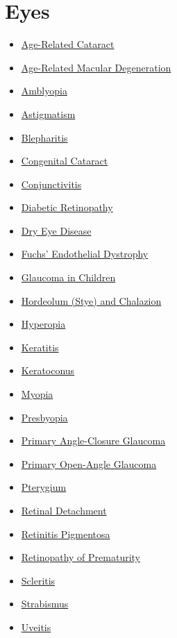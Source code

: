 \section*{Eyes}
\label{sec:organ_eyes}
\begin{itemize}[noitemsep]
  \item \hyperlink{sec:Age-Related Cataract}{Age-Related Cataract}
  \item \hyperlink{sec:Age-Related Macular Degeneration}{Age-Related Macular Degeneration}
  \item \hyperlink{sec:Amblyopia}{Amblyopia}
  \item \hyperlink{sec:Astigmatism}{Astigmatism}
  \item \hyperlink{sec:Blepharitis}{Blepharitis}
  \item \hyperlink{sec:Congenital Cataract}{Congenital Cataract}
  \item \hyperlink{sec:Conjunctivitis}{Conjunctivitis}
  \item \hyperlink{sec:Diabetic Retinopathy}{Diabetic Retinopathy}
  \item \hyperlink{sec:Dry Eye Disease}{Dry Eye Disease}
  \item \hyperlink{sec:Fuchs' Endothelial Dystrophy}{Fuchs' Endothelial Dystrophy}
  \item \hyperlink{sec:Glaucoma in Children}{Glaucoma in Children}
  \item \hyperlink{sec:Hordeolum (Stye) and Chalazion}{Hordeolum (Stye) and Chalazion}
  \item \hyperlink{sec:Hyperopia}{Hyperopia}
  \item \hyperlink{sec:Keratitis}{Keratitis}
  \item \hyperlink{sec:Keratoconus}{Keratoconus}
  \item \hyperlink{sec:Myopia}{Myopia}
  \item \hyperlink{sec:Presbyopia}{Presbyopia}
  \item \hyperlink{sec:Primary Angle-Closure Glaucoma}{Primary Angle-Closure Glaucoma}
  \item \hyperlink{sec:Primary Open-Angle Glaucoma}{Primary Open-Angle Glaucoma}
  \item \hyperlink{sec:Pterygium}{Pterygium}
  \item \hyperlink{sec:Retinal Detachment}{Retinal Detachment}
  \item \hyperlink{sec:Retinitis Pigmentosa}{Retinitis Pigmentosa}
  \item \hyperlink{sec:Retinopathy of Prematurity}{Retinopathy of Prematurity}
  \item \hyperlink{sec:Scleritis}{Scleritis}
  \item \hyperlink{sec:Strabismus}{Strabismus}
  \item \hyperlink{sec:Uveitis}{Uveitis}
\end{itemize}

